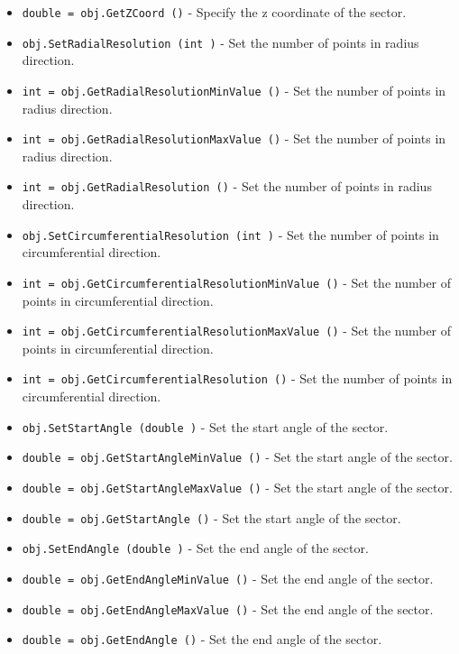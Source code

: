 \begin{itemize}
\item  \verb|double = obj.GetZCoord ()| -  Specify the z coordinate of the sector.

\item  \verb|obj.SetRadialResolution (int )| -  Set the number of points in radius direction.

\item  \verb|int = obj.GetRadialResolutionMinValue ()| -  Set the number of points in radius direction.

\item  \verb|int = obj.GetRadialResolutionMaxValue ()| -  Set the number of points in radius direction.

\item  \verb|int = obj.GetRadialResolution ()| -  Set the number of points in radius direction.

\item  \verb|obj.SetCircumferentialResolution (int )| -  Set the number of points in circumferential direction.

\item  \verb|int = obj.GetCircumferentialResolutionMinValue ()| -  Set the number of points in circumferential direction.

\item  \verb|int = obj.GetCircumferentialResolutionMaxValue ()| -  Set the number of points in circumferential direction.

\item  \verb|int = obj.GetCircumferentialResolution ()| -  Set the number of points in circumferential direction.

\item  \verb|obj.SetStartAngle (double )| -  Set the start angle of the sector.

\item  \verb|double = obj.GetStartAngleMinValue ()| -  Set the start angle of the sector.

\item  \verb|double = obj.GetStartAngleMaxValue ()| -  Set the start angle of the sector.

\item  \verb|double = obj.GetStartAngle ()| -  Set the start angle of the sector.

\item  \verb|obj.SetEndAngle (double )| -  Set the end angle of the sector.

\item  \verb|double = obj.GetEndAngleMinValue ()| -  Set the end angle of the sector.

\item  \verb|double = obj.GetEndAngleMaxValue ()| -  Set the end angle of the sector.

\item  \verb|double = obj.GetEndAngle ()| -  Set the end angle of the sector.

\end{itemize}

